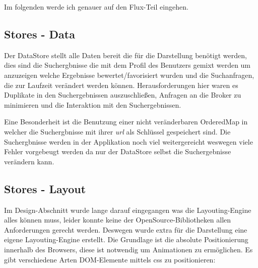 \documentclass[12pt,twoside]{book}
\begin{document}
Im folgenden werde ich genauer auf den Flux-Teil eingehen.

\subsection*{Stores - Data}

Der DataStore stellt alle Daten bereit die für die Darstellung benötigt werden, dies sind die Suchergbnisse die mit dem Profil des Benutzers gemixt werden um anzuzeigen welche Ergebnisse bewertet/favorisiert wurden und die Suchanfragen, die zur Laufzeit verändert werden können. Herausforderungen hier waren es Duplikate in den Suchergebnissen auszuschließen, Anfragen an die Broker zu minimieren und die Interaktion mit den Suchergebnissen.

Eine Besonderheit ist die Benutzung einer nicht veränderbaren OrderedMap in welcher die Suchergbnisse mit ihrer \textit{url} als Schlüssel gespeichert sind. Die Suchergbnisse werden in der Applikation noch viel weitergereicht weswegen viele Fehler vorgebeugt werden da nur der DataStore selbst die Suchergebnisse verändern kann.

\subsection*{Stores - Layout}

Im Design-Abschnitt wurde lange darauf eingegangen was die Layouting-Engine alles können muss, leider konnte keine der OpenSource-Bibliotheken allen Anforderungen gerecht werden. Deswegen wurde extra für die Darstellung eine eigene Layouting-Engine erstellt.
Die Grundlage ist die absolute Positionierung innerhalb des Browsers, diese ist notwendig um Animationen zu ermöglichen. Es gibt verschiedene Arten DOM-Elemente mittels css zu positionieren:
\end{document}
